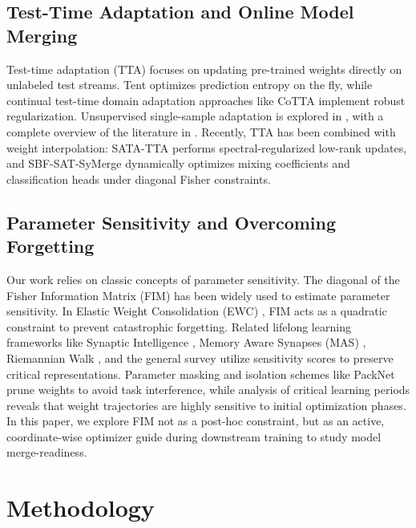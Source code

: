 \documentclass{article}
\theoremstyle{plain}
\theoremstyle{definition}
\theoremstyle{remark}
\begin{document}
\subsection{Test-Time Adaptation and Online Model Merging}
Test-time adaptation (TTA) focuses on updating pre-trained weights directly on unlabeled test streams. Tent \cite{wang2021tent} optimizes prediction entropy on the fly, while continual test-time domain adaptation approaches like CoTTA \cite{wang2022continual,yuan2023robust} \cite{liang2020source,niu2022efficient} \cite{zhang2022memo} implement robust regularization. Unsupervised single-sample adaptation is explored in \cite{zhang2022memo,boudiaf2022parameter}, with a complete overview of the literature in \cite{zhao2023test}. Recently, TTA has been combined with weight interpolation: SATA-TTA \cite{sata25} performs spectral-regularized low-rank updates, and SBF-SAT-SyMerge \cite{sbf25} dynamically optimizes mixing coefficients and classification heads under diagonal Fisher constraints.

\subsection{Parameter Sensitivity and Overcoming Forgetting}
Our work relies on classic concepts of parameter sensitivity. The diagonal of the Fisher Information Matrix (FIM) has been widely used to estimate parameter sensitivity. In Elastic Weight Consolidation (EWC) \cite{kirkpatrick17}, FIM acts as a quadratic constraint to prevent catastrophic forgetting. Related lifelong learning frameworks like Synaptic Intelligence \cite{zenke2017continual}, Memory Aware Synapses (MAS) \cite{aljundi2018memory}, Riemannian Walk \cite{chaudhry2018riemannian}, and the general survey \cite{de2021continual} utilize sensitivity scores to preserve critical representations. Parameter masking and isolation schemes like PackNet \cite{mallya2018packnet} prune weights to avoid task interference, while analysis of critical learning periods \cite{achille18} reveals that weight trajectories are highly sensitive to initial optimization phases. In this paper, we explore FIM not as a post-hoc constraint, but as an active, coordinate-wise optimizer guide during downstream training to study model merge-readiness.

\section{Methodology}
\label{sec:method}
\end{document}
